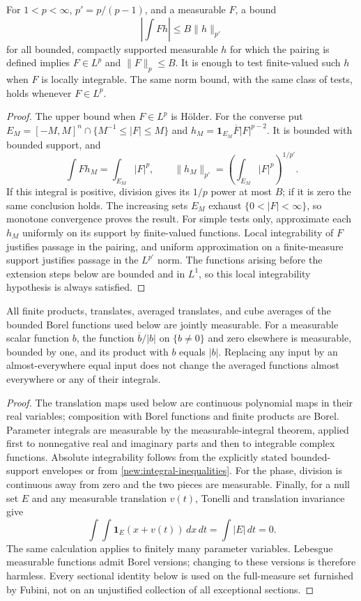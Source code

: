 \documentclass[11pt]{article}
\theoremstyle{definition}
\newcommand{\one}{\mathbf 1}
\begin{document}
\begin{lemma}\label{new:duality}
For $1<p<\infty$, $p'=p/(p-1)$, and a measurable $F$, a bound
\[
 \left|\int Fh\right|\leq B\|h\|_{p'}
\]
for all bounded, compactly supported measurable $h$ for which the pairing is defined implies
$F\in L^p$ and $\|F\|_p\leq B$. It is enough to test finite-valued such $h$ when $F$ is locally
integrable. The same norm bound, with the same class of tests, holds whenever $F\in L^p$.
\end{lemma}
\begin{proof}
The upper bound when $F\in L^p$ is H\"older. For the converse put
$E_M=[-M,M]^n\cap\{M^{-1}\leq|F|\leq M\}$ and
$h_M=\one_{E_M}\overline F|F|^{p-2}$. It is bounded with bounded support, and
\[
 \int Fh_M=\int_{E_M}|F|^p,
 \qquad \|h_M\|_{p'}=\left(\int_{E_M}|F|^p\right)^{1/p'}.
\]
If this integral is positive, division gives its $1/p$ power at most $B$; if it is zero the
same conclusion holds. The increasing sets $E_M$ exhaust $\{0<|F|<\infty\}$, so monotone
convergence proves the result. For simple tests only, approximate each $h_M$ uniformly on
its support by finite-valued functions. Local integrability of $F$ justifies passage in the
pairing, and uniform approximation on a finite-measure support justifies passage in the
$L^{p'}$ norm. The functions arising before the extension steps below are bounded and in
$L^1$, so this local integrability hypothesis is always satisfied.
\end{proof}

\begin{lemma}\label{new:measurability}
All finite products, translates, averaged translates, and cube averages of the bounded Borel
functions used below are jointly measurable. For a measurable scalar function $b$, the function
$\overline b/|b|$ on $\{b\ne0\}$ and zero elsewhere is measurable, bounded by one, and
its product with $b$ equals $|b|$. Replacing any input by an almost-everywhere equal input
does not change the averaged functions almost everywhere or any of their integrals.
\end{lemma}
\begin{proof}
The translation maps used below are continuous polynomial maps in their real variables;
composition with Borel functions and finite products are Borel. Parameter integrals are
measurable by the measurable-integral theorem, applied first to nonnegative real and
imaginary parts and then to integrable complex functions. Absolute integrability follows
from the explicitly stated bounded-support envelopes or from
\cref{new:integral-inequalities}. For the phase, division is continuous away from zero and
the two pieces are measurable. Finally, for a null set $E$ and any measurable translation
$v(t)$, Tonelli and translation invariance give
\[
 \int\!\int\one_E(x+v(t))\,dx\,dt=\int|E|\,dt=0.
\]
The same calculation applies to finitely many parameter variables. Lebesgue measurable
functions admit Borel versions; changing to these versions is therefore harmless. Every
sectional identity below is used on the full-measure set furnished by Fubini, not on an
unjustified collection of all exceptional sections.
\end{proof}
\end{document}
